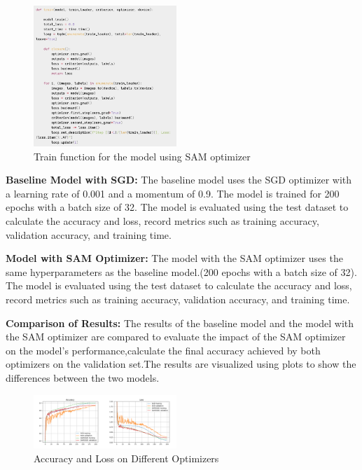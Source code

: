 \documentclass[twocolumn]{article}
\begin{document}
    \begin{figure}[ht]
        \centering
        \includegraphics[width=0.48\textwidth]{train_function.png}
        \caption{Train function for the model using SAM optimizer}
        \label{fig:train_function}
    \end{figure}

    \textbf{Baseline Model with SGD:} The baseline model uses the SGD optimizer\cite{bottou_stochastic_2012} with a learning rate of 0.001 and a momentum of 0.9. The model is trained for 200 epochs with a batch size of 32. The model is evaluated using the test dataset to calculate the accuracy and loss, record metrics such as training accuracy, validation accuracy, and training time.
    
    \textbf{Model with SAM Optimizer:} The model with the SAM optimizer uses the same hyperparameters as the baseline model.(200 epochs with a batch size of 32). The model is evaluated using the test dataset to calculate the accuracy and loss, record metrics such as training accuracy, validation accuracy, and training time.

    \textbf{Comparison of Results:} The results of the baseline model and the model with the SAM optimizer are compared to evaluate the impact of the SAM optimizer on the model's performance,calculate the final accuracy achieved by both optimizers on the validation set.The results are visualized using plots to show the differences between the two models.

    \begin{figure}[ht]
        \centering
        \includegraphics[width=0.48\textwidth]{Accuracy and Loss on Different Optimizers.png}
        \caption{Accuracy and Loss on Different Optimizers}
        \label{fig:Accuracy and Loss on Different Optimizers}
    \end{figure}
\end{document}
